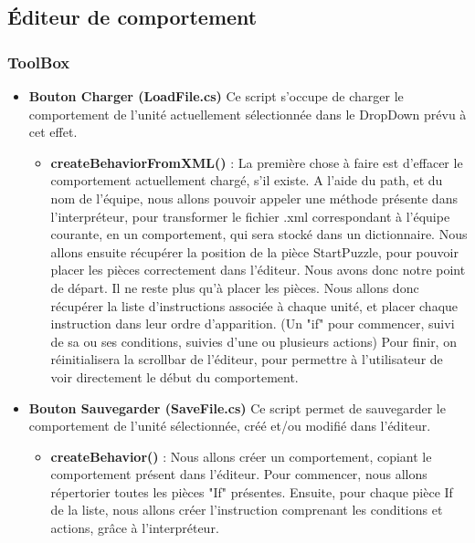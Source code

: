 \documentclass{article}
\begin{document}
\subsection{Éditeur de comportement}
\subsubsection{ToolBox}
\begin{itemize}
\item \textbf{Bouton Charger (LoadFile.cs)}
\smallbreak
Ce script s'occupe de charger le comportement de l'unité actuellement sélectionnée dans le DropDown prévu à cet effet.\newline
\smallbreak
\begin{itemize}
\item\textbf{createBehaviorFromXML()} : La première chose à faire est d'effacer le comportement actuellement chargé, s'il existe.
A l'aide du path, et du nom de l'équipe, nous allons pouvoir appeler une méthode présente dans l’interpréteur, pour transformer le fichier .xml correspondant à l'équipe courante, en un comportement, qui sera stocké dans un dictionnaire.\newline
Nous allons ensuite récupérer la position de la pièce StartPuzzle, pour pouvoir placer les pièces correctement dans l'éditeur. Nous avons donc notre point de départ.\newline 
Il ne reste plus qu'à placer les pièces. Nous allons donc récupérer la liste d'instructions associée à chaque unité, et placer chaque instruction dans leur ordre d'apparition. (Un "if" pour commencer, suivi de sa ou ses conditions, suivies d'une ou plusieurs actions)\newline
Pour finir, on réinitialisera la scrollbar de l'éditeur, pour permettre à l'utilisateur de voir directement le début du comportement.
\smallbreak
\end{itemize}
\item\textbf{Bouton Sauvegarder (SaveFile.cs)}
\smallbreak
Ce script permet de sauvegarder le comportement de l'unité sélectionnée, créé et/ou modifié dans l'éditeur.\newline
\smallbreak
\begin{itemize}
\item\textbf{createBehavior()} : Nous allons créer un comportement, copiant le comportement présent dans l'éditeur. Pour commencer, nous allons répertorier toutes les pièces "If" présentes. Ensuite, pour chaque pièce If de la liste, nous allons créer l'instruction comprenant les conditions et actions, grâce à l'interpréteur.\newline

\end{itemize}
\end{itemize}
\end{document}
